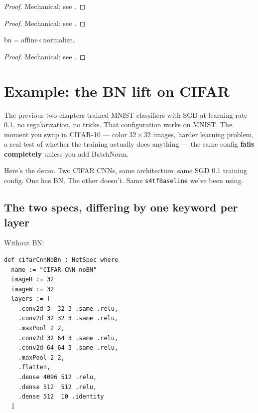 \begin{proof}
\leanok
Mechanical; see .
\end{proof}

\begin{theorem}
  \label{thm:bnAffine_has_vjp}
  \leanok
\end{theorem}

\begin{proof}
\leanok
Mechanical; see .
\end{proof}

\begin{theorem}
  \label{thm:bn_has_vjp}
  \leanok
  \(\mathrm{bn} = \mathrm{affine} \circ \mathrm{normalize}\).
\end{theorem}

\begin{proof}
\leanok
Mechanical; see .
\end{proof}

\section{Example: the BN lift on CIFAR}
\label{sec:bn_cifar_example}

The previous two chapters trained MNIST classifiers with SGD at
learning rate 0.1, no regularization, no tricks. That configuration
works on MNIST. The moment you swap in CIFAR-10 --- color
$32 \times 32$ images, harder learning problem, a real test of
whether the training actually does anything --- the same config
\textbf{fails completely} unless you add BatchNorm.

Here's the demo. Two CIFAR CNNs, same architecture, same SGD 0.1
training config. One has BN. The other doesn't. Same
\texttt{s4tfBaseline} we've been using.

\subsection*{The two specs, differing by one keyword per layer}

Without BN:

\begin{verbatim}
def cifarCnnNoBn : NetSpec where
  name := "CIFAR-CNN-noBN"
  imageH := 32
  imageW := 32
  layers := [
    .conv2d 3  32 3 .same .relu,
    .conv2d 32 32 3 .same .relu,
    .maxPool 2 2,
    .conv2d 32 64 3 .same .relu,
    .conv2d 64 64 3 .same .relu,
    .maxPool 2 2,
    .flatten,
    .dense 4096 512 .relu,
    .dense 512  512 .relu,
    .dense 512  10 .identity
  ]
\end{verbatim}


